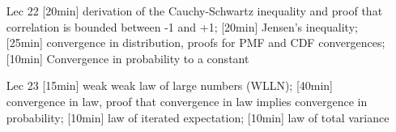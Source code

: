 \begin{enumerate}
\item[Lec 22] [20min] derivation of the Cauchy-Schwartz inequality and proof that correlation is bounded between -1 and +1; [20min] Jensen's inequality; [25min] convergence in distribution, proofs for PMF and CDF convergences; [10min] Convergence in probability to a constant

\item[Lec 23] [15min] weak weak law of large numbers (WLLN); [40min] convergence in law, proof that convergence in law implies convergence in probability; [10min] law of iterated expectation; [10min] law of total variance
\end{enumerate}